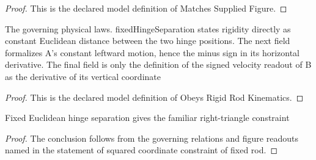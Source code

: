 \begin{proof}
  This is the declared model definition of Matches Supplied Figure.
\end{proof}
\begin{definition}
  \label{def:physics:phyx-mini-0673:phyxminiproblems-problemphyxmini0673-obeysrigidrodkinematics}
  The governing physical laws. fixedHingeSeparation states rigidity directly as constant Euclidean distance between the two hinge positions. The next field formalizes A's constant leftward motion, hence the minus sign in its horizontal derivative. The final field is only the definition of the signed velocity readout of B as the derivative of its vertical coordinate
\end{definition}
\begin{proof}
  This is the declared model definition of Obeys Rigid Rod Kinematics.
\end{proof}
\begin{theorem}
  \label{thm:physics:phyx-mini-0673:phyxminiproblems-problemphyxmini0673-squared-coordinate-constraint-of-fixed-rod}
  Fixed Euclidean hinge separation gives the familiar right-triangle constraint
\end{theorem}
\begin{proof}
  The conclusion follows from the governing relations and figure readouts named in the statement of squared coordinate constraint of fixed rod.
\end{proof}
